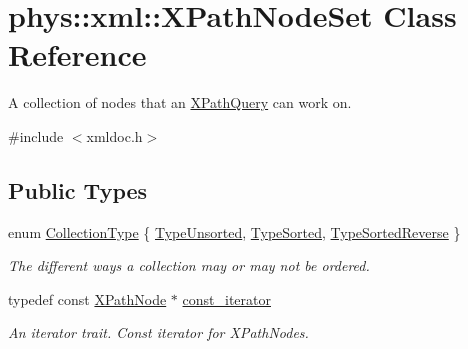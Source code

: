 \hypertarget{classphys_1_1xml_1_1XPathNodeSet}{
\section{phys::xml::XPathNodeSet Class Reference}
\label{de/dc2/classphys_1_1xml_1_1XPathNodeSet}
}


A collection of nodes that an \hyperlink{classphys_1_1xml_1_1XPathQuery}{XPathQuery} can work on.  




{\ttfamily \#include $<$xmldoc.h$>$}

\subsection*{Public Types}
\begin{DoxyCompactItemize}
\item 
enum \hyperlink{classphys_1_1xml_1_1XPathNodeSet_ab178d39e119369702541033c067a995c}{CollectionType} \{ \hyperlink{classphys_1_1xml_1_1XPathNodeSet_ab178d39e119369702541033c067a995ca8f4fe063043fb03da3c074b4c6c7879c}{TypeUnsorted}, 
\hyperlink{classphys_1_1xml_1_1XPathNodeSet_ab178d39e119369702541033c067a995ca1a79973b465ba264dfaae55836121be2}{TypeSorted}, 
\hyperlink{classphys_1_1xml_1_1XPathNodeSet_ab178d39e119369702541033c067a995caea04d0c99f11c8b4deeccb6316911420}{TypeSortedReverse}
 \}
\begin{DoxyCompactList}\small\item\em The different ways a collection may or may not be ordered. \item\end{DoxyCompactList}\item 
\hypertarget{classphys_1_1xml_1_1XPathNodeSet_a64ed5a3479ae329b0753354dcceba7d3}{
typedef const \hyperlink{classphys_1_1xml_1_1XPathNode}{XPathNode} $\ast$ \hyperlink{classphys_1_1xml_1_1XPathNodeSet_a64ed5a3479ae329b0753354dcceba7d3}{const\_\-iterator}}
\label{de/dc2/classphys_1_1xml_1_1XPathNodeSet_a64ed5a3479ae329b0753354dcceba7d3}

\begin{DoxyCompactList}\small\item\em An iterator trait. Const iterator for XPathNodes. \item\end{DoxyCompactList}\end{DoxyCompactItemize}
